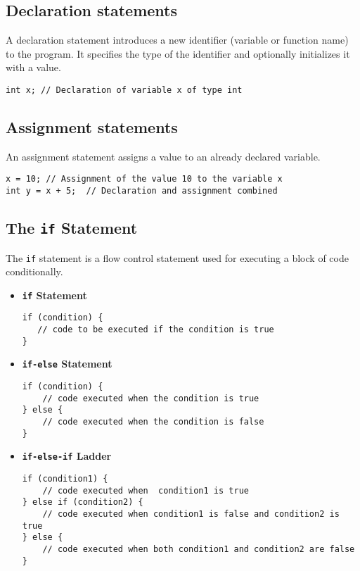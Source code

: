 \documentclass[11pt,A4]{article}
\begin{document}
        \subsection{Declaration statements}
        A declaration statement introduces a new identifier (variable or function name) to the program. It specifies the type of the identifier and optionally initializes it with a value.
        \begin{lstlisting}
int x; // Declaration of variable x of type int
        \end{lstlisting}

        \subsection{Assignment statements}
        An assignment statement assigns a value to an already declared variable.
        \begin{lstlisting}
x = 10; // Assignment of the value 10 to the variable x
int y = x + 5;  // Declaration and assignment combined
        \end{lstlisting}
        
        \subsection{The \texttt{if} Statement}
        The \texttt{if} statement is a flow control statement used for executing a block of code conditionally.
        \begin{itemize}
            \item \textbf{\texttt{if} Statement}
            \begin{lstlisting}
if (condition) {
   // code to be executed if the condition is true
}
            \end{lstlisting}
            
            \item \textbf{\texttt{if-else} Statement}
            \begin{lstlisting}
if (condition) {
    // code executed when the condition is true
} else {
    // code executed when the condition is false
}
            \end{lstlisting}

            \item \textbf{\texttt{if-else-if} Ladder}
            \begin{lstlisting}
if (condition1) {
    // code executed when  condition1 is true
} else if (condition2) { 
    // code executed when condition1 is false and condition2 is true
} else {
    // code executed when both condition1 and condition2 are false
}
            \end{lstlisting}
        \end{itemize}
        
\end{document}
